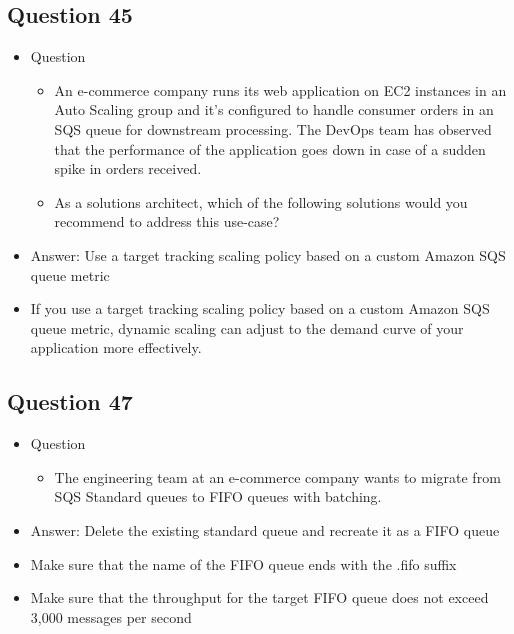 \documentclass[]{scrartcl}
\begin{document}
\subsection{Question 45}
\begin{itemize}
	\item Question
	\begin{itemize}
		\item An e-commerce company runs its web application on EC2 instances in an Auto Scaling group and it's configured to handle consumer orders in an SQS queue for downstream processing. The DevOps team has observed that the performance of the application goes down in case of a sudden spike in orders received.
		\item As a solutions architect, which of the following solutions would you recommend to address this use-case?
	\end{itemize}
	\item Answer: Use a target tracking scaling policy based on a custom Amazon SQS queue metric
	\item If you use a target tracking scaling policy based on a custom Amazon SQS queue metric, dynamic scaling can adjust to the demand curve of your application more effectively. 
\end{itemize}

\subsection{Question 47}
\begin{itemize}
	\item Question
	\begin{itemize}
		\item The engineering team at an e-commerce company wants to migrate from SQS Standard queues to FIFO queues with batching.
	\end{itemize}
	\item Answer: Delete the existing standard queue and recreate it as a FIFO queue
	\item Make sure that the name of the FIFO queue ends with the .fifo suffix
	\item Make sure that the throughput for the target FIFO queue does not exceed 3,000 messages per second
\end{itemize}
\end{document}
